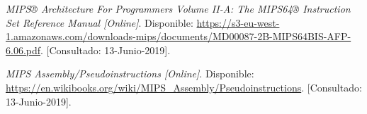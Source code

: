 \documentclass{article}
\begin{document}
 \begin{thebibliography}{1}
	\textit{MIPS® Architecture For Programmers Volume II-A: The MIPS64® Instruction Set Reference Manual [Online]}. Disponible:
	\url{https://s3-eu-west-1.amazonaws.com/downloads-mips/documents/MD00087-2B-MIPS64BIS-AFP-6.06.pdf}.
	[Consultado: 13-Junio-2019].

	\textit{MIPS Assembly/Pseudoinstructions [Online]}. Disponible:
	\url{https://en.wikibooks.org/wiki/MIPS_Assembly/Pseudoinstructions}.
	[Consultado: 13-Junio-2019].

\end{thebibliography}
\end{document}
